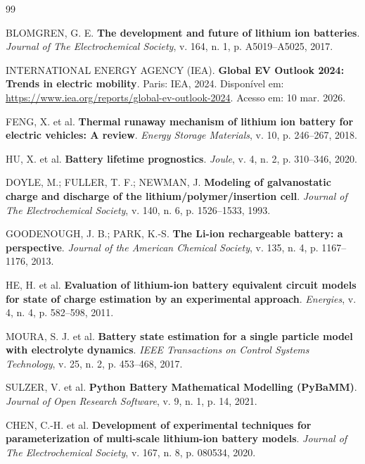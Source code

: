 \documentclass[
    12pt,
    openright,
    twoside,
    a4paper,
    brazil,
    english
]{abntex2}
\begin{document}
\begin{thebibliography}{99}

BLOMGREN, G. E.
\textbf{The development and future of lithium ion batteries}.
\textit{Journal of The Electrochemical Society}, v. 164, n. 1,
p. A5019--A5025, 2017.

INTERNATIONAL ENERGY AGENCY (IEA).
\textbf{Global EV Outlook 2024: Trends in electric mobility}.
Paris: IEA, 2024. Disponível em: \url{https://www.iea.org/reports/global-ev-outlook-2024}.
Acesso em: 10 mar. 2026.

FENG, X. et al.
\textbf{Thermal runaway mechanism of lithium ion battery for electric vehicles:
A review}.
\textit{Energy Storage Materials}, v. 10, p. 246--267, 2018.

HU, X. et al.
\textbf{Battery lifetime prognostics}.
\textit{Joule}, v. 4, n. 2, p. 310--346, 2020.

DOYLE, M.; FULLER, T. F.; NEWMAN, J.
\textbf{Modeling of galvanostatic charge and discharge of the lithium/polymer/insertion
cell}.
\textit{Journal of The Electrochemical Society}, v. 140, n. 6,
p. 1526--1533, 1993.

GOODENOUGH, J. B.; PARK, K.-S.
\textbf{The Li-ion rechargeable battery: a perspective}.
\textit{Journal of the American Chemical Society}, v. 135, n. 4,
p. 1167--1176, 2013.

HE, H. et al.
\textbf{Evaluation of lithium-ion battery equivalent circuit models for state
of charge estimation by an experimental approach}.
\textit{Energies}, v. 4, n. 4, p. 582--598, 2011.

MOURA, S. J. et al.
\textbf{Battery state estimation for a single particle model with electrolyte
dynamics}.
\textit{IEEE Transactions on Control Systems Technology}, v. 25, n. 2,
p. 453--468, 2017.

SULZER, V. et al.
\textbf{Python Battery Mathematical Modelling (PyBaMM)}.
\textit{Journal of Open Research Software}, v. 9, n. 1, p. 14, 2021.

CHEN, C.-H. et al.
\textbf{Development of experimental techniques for parameterization of
multi-scale lithium-ion battery models}.
\textit{Journal of The Electrochemical Society}, v. 167, n. 8,
p. 080534, 2020.


\end{thebibliography}
\end{document}
